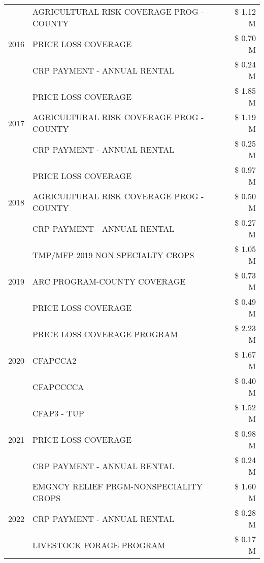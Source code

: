 \begin{tabular}{llr}
\cline{1-3}
\multirow[t]{3}{*}{2016} & AGRICULTURAL RISK COVERAGE PROG - COUNTY & \$ 1.12 M \\
 & PRICE LOSS COVERAGE & \$ 0.70 M \\
 & CRP PAYMENT - ANNUAL RENTAL & \$ 0.24 M \\
\cline{1-3}
\multirow[t]{3}{*}{2017} & PRICE LOSS COVERAGE & \$ 1.85 M \\
 & AGRICULTURAL RISK COVERAGE PROG - COUNTY & \$ 1.19 M \\
 & CRP PAYMENT - ANNUAL RENTAL & \$ 0.25 M \\
\cline{1-3}
\multirow[t]{3}{*}{2018} & PRICE LOSS COVERAGE & \$ 0.97 M \\
 & AGRICULTURAL RISK COVERAGE PROG - COUNTY & \$ 0.50 M \\
 & CRP PAYMENT - ANNUAL RENTAL & \$ 0.27 M \\
\cline{1-3}
\multirow[t]{3}{*}{2019} & TMP/MFP 2019 NON SPECIALTY CROPS & \$ 1.05 M \\
 & ARC PROGRAM-COUNTY COVERAGE & \$ 0.73 M \\
 & PRICE LOSS COVERAGE & \$ 0.49 M \\
\cline{1-3}
\multirow[t]{3}{*}{2020} & PRICE LOSS COVERAGE PROGRAM & \$ 2.23 M \\
 & CFAPCCA2 & \$ 1.67 M \\
 & CFAPCCCCA & \$ 0.40 M \\
\cline{1-3}
\multirow[t]{3}{*}{2021} & CFAP3 - TUP & \$ 1.52 M \\
 & PRICE LOSS COVERAGE & \$ 0.98 M \\
 & CRP PAYMENT - ANNUAL RENTAL & \$ 0.24 M \\
\cline{1-3}
\multirow[t]{3}{*}{2022} & EMGNCY RELIEF PRGM-NONSPECIALITY CROPS & \$ 1.60 M \\
 & CRP PAYMENT - ANNUAL RENTAL & \$ 0.28 M \\
 & LIVESTOCK FORAGE PROGRAM & \$ 0.17 M \\
\cline{1-3}
\bottomrule
\end{tabular}
